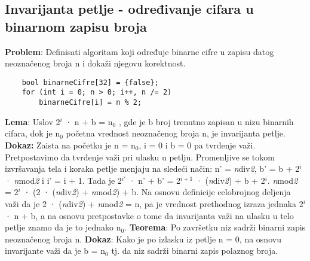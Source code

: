 \documentclass{article}
\begin{document}
\subsection{Invarijanta petlje - određivanje cifara u binarnom zapisu broja}
\textbf{Problem}: Definisati algoritam koji određuje binarne cifre u zapisu datog neoznačenog broja n i dokaži njegovu korektnost. 
\begin{lstlisting}
    bool binarneCifre[32] = {false}; 
    for (int i = 0; n > 0; i++, n /= 2) 
		binarneCifre[i] = n % 2;
\end{lstlisting}
\textbf{Lema}: Uslov 2$^{i}$ · n + b = n$_{0}$ , gde je b broj trenutno zapisan u nizu binarnih cifara, dok je n$_{0}$ početna vrednost neoznačenog broja n, je invarijanta petlje.
\newline \hspace*{0.4cm}\textbf{Dokaz:}
\newline \hspace*{0.8cm}Zaista na početku je n = n$_{0}$, i = 0 i b = 0 pa tvrđenje važi.
	Pretpostavimo \hspace*{0.8cm}da tvrđenje važi pri ulasku u petlju. Promenljive se tokom izvršavanja tela \hspace*{0.8cm}i koraka petlje menjaju na sledeći način: n' = \textit{n}div\textit{2}, b' = b + 2$^{i}$ · \textit{n}mod\textit{2} \hspace*{0.8cm}i i' = i + 1. Tada je 2$^{i'}$ · n' + b' = 2$^{i+1}$ · 
	(\textit{n}div\textit{2}) + b + 2$^{i}$. \newline \hspace*{0.8cm}\textit{n}mod\textit{2} = 2$^{i}$ · (2 · (\textit{n}div\textit{2}) + \textit{n}mod\textit{2}) + b. Na osnovu 	definicije celobrojnog \hspace*{0.8cm}deljenja važi da je 2 · (\textit{n}div\textit{2}) + \textit{n}mod\textit{2} = n, pa je vrednost 	prethodnog \hspace*{0.8cm}izraza jednaka 2$^{i}$ · n + b, a na osnovu pretpostavke o tome da invarijanta \hspace*{0.8cm}važi na 	ulasku u telo petlje znamo da je to jednako n$_{0}$.
\vspace{0.2cm}	\newline 
\textbf{Teorema}: Po završetku niz sadrži binarni zapis neoznačenog broja n.
\newline \hspace*{0.4cm}\textbf{Dokaz}:
\newline \hspace*{0.8cm}Kako je po izlasku iz petlje n = 0, na osnovu invarijante važi da je b = n$_{0}$ \hspace*{0.8cm}tj. da niz sadrži 	binarni zapis polaznog broja.
\end{document}
